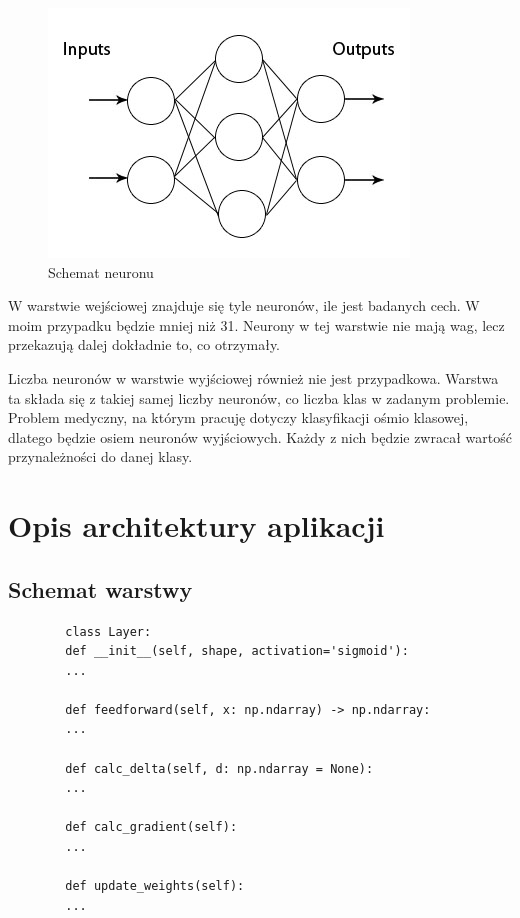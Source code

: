 \documentclass{report}
\begin{document}
    \begin{figure}[H]
        \centering
        \includegraphics[scale=0.9]{./img/mlp.jpg}
        \caption{Schemat neuronu}
    \end{figure}

    W warstwie wejściowej znajduje się tyle neuronów, ile jest badanych cech.
    W moim przypadku będzie mniej niż 31.
    Neurony w tej warstwie nie mają wag, lecz przekazują dalej dokładnie to, co otrzymały.

    Liczba neuronów w warstwie wyjściowej również nie jest przypadkowa.
    Warstwa ta składa się z takiej samej liczby neuronów, co liczba klas w zadanym problemie.
    Problem medyczny, na którym pracuję dotyczy klasyfikacji ośmio klasowej, dlatego będzie osiem neuronów wyjściowych.
    Każdy z nich będzie zwracał wartość przynależności do danej klasy.




    \chapter{Opis architektury aplikacji}

    \section{Schemat warstwy}


    \begin{lstlisting}
        class Layer:
        def __init__(self, shape, activation='sigmoid'):
        ...

        def feedforward(self, x: np.ndarray) -> np.ndarray:
        ...

        def calc_delta(self, d: np.ndarray = None):
        ...

        def calc_gradient(self):
        ...

        def update_weights(self):
        ...
    \end{lstlisting}
    \label{Schemat klasy Layer}
\end{document}
